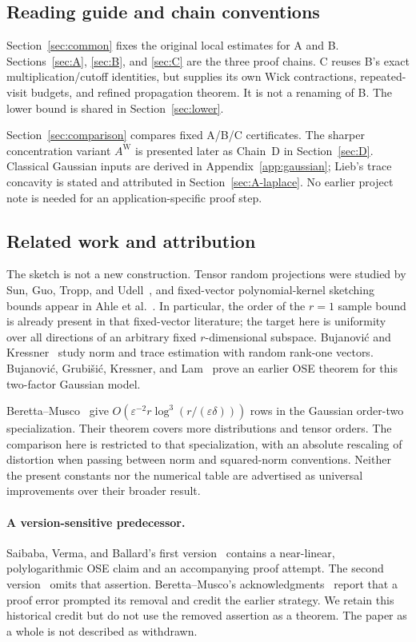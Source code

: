 \documentclass[11pt]{article}
\numberwithin{equation}{section}
\theoremstyle{definition}\newtheorem{definition}[theorem]{Definition}
\theoremstyle{remark}\newtheorem{remark}[theorem]{Remark}
\begin{document}
\subsection{Reading guide and chain conventions}
Section~\ref{sec:common} fixes the original local estimates for A and B.
Sections~\ref{sec:A}, \ref{sec:B}, and \ref{sec:C} are the three proof chains.
C reuses B's exact multiplication/cutoff identities, but supplies its own Wick
contractions, repeated-visit budgets, and refined propagation theorem. It is
not a renaming of B. The lower bound is shared in Section~\ref{sec:lower}.

Section~\ref{sec:comparison} compares fixed A/B/C certificates. The sharper
concentration variant $A^{\mathrm W}$ is presented later as Chain~D in Section~\ref{sec:D}.
Classical Gaussian inputs are derived in Appendix~\ref{app:gaussian}; Lieb's
trace concavity is stated and attributed in Section~\ref{sec:A-laplace}.
No earlier project note is needed for an application-specific proof step.

\clearpage
\subsection{Related work and attribution}\label{sec:attribution-intro}
The sketch is not a new construction. Tensor random projections were studied by
Sun, Guo, Tropp, and Udell~\cite{Sun}, and fixed-vector polynomial-kernel sketching
bounds appear in Ahle et al.~\cite[Appendix~A.2, Theorem~42]{Ahle}.
In particular, the order of the $r=1$ sample bound is already present in that
fixed-vector literature; the target
here is uniformity over all directions of an arbitrary fixed $r$-dimensional
subspace. Bujanovi\'c and Kressner~\cite{BK} study norm and trace estimation with
random rank-one vectors. Bujanovi\'c, Grubi\v{s}i\'c, Kressner, and
Lam~\cite{BGKL} prove an earlier OSE theorem for this two-factor Gaussian model.

Beretta--Musco~\cite[Theorem~1.3]{BM} give
$O(\varepsilon^{-2}r\log^3(r/(\varepsilon\delta)))$ rows in the Gaussian
order-two specialization. Their theorem covers more distributions and tensor
orders. The comparison here is restricted to that specialization, with an
absolute rescaling of distortion when passing between norm and squared-norm
conventions. Neither the present constants nor the numerical table are advertised
as universal improvements over their broader result.

\paragraph{A version-sensitive predecessor.}
Saibaba, Verma, and Ballard's first version~\cite[Theorem~11]{SVBv1}
contains a near-linear, polylogarithmic OSE claim and an accompanying proof
attempt. The second version~\cite{SVBv2} omits that assertion. Beretta--Musco's
acknowledgments~\cite{BM} report that a proof error prompted its removal and
credit the earlier strategy. We retain this historical credit but do not use the
removed assertion as a theorem. The paper as a whole is not described as withdrawn.
\end{document}
